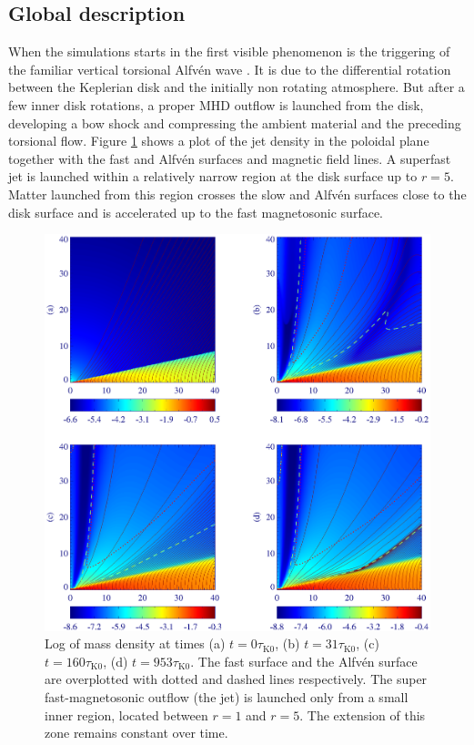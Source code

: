 \documentclass{aa}
\begin{document}
\subsection{Global description}
When the simulations starts in the first visible phenomenon is the triggering of the familiar vertical torsional Alfv\'en wave \citep{1980ApJ...237..877M,1997ApJ...482..712O}.  It is due to the
differential rotation between the Keplerian disk and the initially non rotating atmosphere. But after a few inner disk rotations, a proper MHD outflow is launched from the disk, developing a bow shock
and compressing the ambient material and the preceding torsional flow. Figure \ref{bigfig} shows a plot of the jet density in the poloidal plane together with the fast and Alfv\'en surfaces and
magnetic field lines. A superfast jet is launched within a relatively narrow region at the disk surface up to $r=5$. Matter launched from this region crosses the slow and Alfv\'en surfaces close to
the disk surface and is accelerated up to the fast magnetosonic surface.

\begin{figure}[t]
\sidecaption
   \includegraphics[width=12cm]{12633c01.eps}
   \caption{Log of mass density at times (a) $t=0 \tau_\mathrm{K0}$, (b) $t=31 \tau_\mathrm{K0}$, (c) $t=160 \tau_\mathrm{K0}$, (d) $t=953 \tau_\mathrm{K0}$. The fast surface and the Alfv\'en surface are overplotted with
   dotted and dashed lines respectively. The super fast-magnetosonic outflow (the jet) is launched only from a small inner region, located between $r=1$ and $r=5$.  The extension of this zone remains constant over time.}
   \label{bigfig}%
\end{figure}
\end{document}
